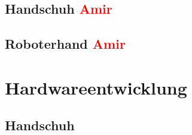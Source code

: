 \documentclass[11pt]{article}
\begin{document}
\subsection{Handschuh \textcolor{red}{Amir}}

\subsection{Roboterhand \textcolor{red}{Amir}}


\section{Hardwareentwicklung}

\subsection{Handschuh}
\end{document}

